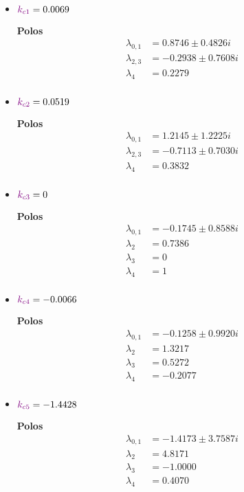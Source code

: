 \begin{multicols}{2}
  \begin{itemize}
      \item \(\mathbin{\color{violet}k_{c1}} = 0.0069  \) 

        \textbf{Polos}
        \begin{align}
        \lambda_{0,1} &= 0.8746 \pm 0.4826i\\
        \lambda_{2,3} &= -0.2938 \pm 0.7608i \\
        \lambda_{4} &= 0.2279 \\
        \end{align}

      \item \(\mathbin{\color{violet}k_{c2}} = 0.0519\)

      \textbf{Polos}
      \begin{align}
        \lambda_{0,1} &= 1.2145 \pm 1.2225i \\
        \lambda_{2,3} &= -0.7113 \pm 0.7030i\\
        \lambda_{4} &= 0.3832 \\
        \end{align}

    \item \(\mathbin{\color{violet}k_{c3}} = 0\)

    \textbf{Polos}
    \begin{align}
      \lambda_{0,1} &= -0.1745 \pm 0.8588i \\
      \lambda_{2} &= 0.7386  \\
      \lambda_{3} &= 0  \\
      \lambda_{4} &= 1  \\
    \end{align}
        
  \end{itemize}
  \columnbreak
  \begin{itemize}
      \item \(\mathbin{\color{violet}k_{c4}} = -0.0066\)

      \textbf{Polos}
      \begin{align}
        \lambda_{0,1} &= -0.1258 \pm 0.9920i \\
        \lambda_{2} &= 1.3217\\
        \lambda_{3} &= 0.5272  \\
        \lambda_{4} &= -0.2077\\
        \end{align}

      \item \(\mathbin{\color{violet}k_{c5}} = -1.4428\)

      \textbf{Polos}
      \begin{align}
        \lambda_{0,1} &= -1.4173 \pm 3.7587i \\
        \lambda_{2} &= 4.8171 \\
        \lambda_{3} &= -1.0000  \\
        \lambda_{4} &= 0.4070   \\
        \end{align}       
  \end{itemize}
\end{multicols}

